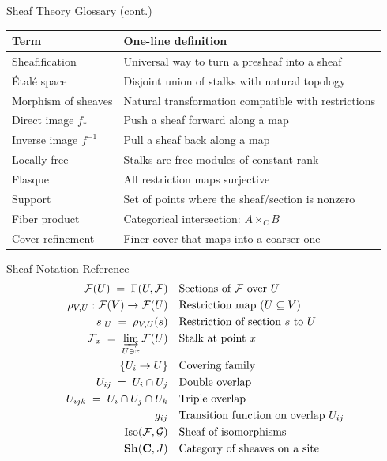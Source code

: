 \documentclass[aspectratio=169,10pt]{beamer}
\newcommand{\Fscr}{\mathcal{F}}
\newcommand{\Gscr}{\mathcal{G}}
\newcommand{\Iso}{\mathrm{Iso}}
\begin{document}
\begin{frame}{Sheaf Theory Glossary (cont.)}
\footnotesize
\renewcommand{\arraystretch}{1.2}
\begin{tabular}{@{}lp{8.5cm}@{}}
\toprule
\textbf{Term} & \textbf{One-line definition} \\
\midrule
Sheafification & Universal way to turn a presheaf into a sheaf \\
\'Etal\'e space & Disjoint union of stalks with natural topology \\
Morphism of sheaves & Natural transformation compatible with restrictions \\
Direct image $f_*$ & Push a sheaf forward along a map \\
Inverse image $f^{-1}$ & Pull a sheaf back along a map \\
Locally free & Stalks are free modules of constant rank \\
Flasque & All restriction maps surjective \\
Support & Set of points where the sheaf/section is nonzero \\
Fiber product & Categorical intersection: $A \times_C B$ \\
Cover refinement & Finer cover that maps into a coarser one \\
\bottomrule
\end{tabular}
\end{frame}

\begin{frame}{Sheaf Notation Reference}
\begin{align*}
\Fscr(U) \;=\; \Gamma(U, \Fscr) &\quad\text{Sections of $\Fscr$ over $U$} \\
\rho_{V,U} : \Fscr(V) \to \Fscr(U) &\quad\text{Restriction map ($U \subseteq V$)} \\
s|_U \;=\; \rho_{V,U}(s) &\quad\text{Restriction of section $s$ to $U$} \\
\Fscr_x \;=\; \varinjlim_{U \ni x} \Fscr(U) &\quad\text{Stalk at point $x$} \\
\{U_i \to U\} &\quad\text{Covering family} \\
U_{ij} \;=\; U_i \cap U_j &\quad\text{Double overlap} \\
U_{ijk} \;=\; U_i \cap U_j \cap U_k &\quad\text{Triple overlap} \\
g_{ij} &\quad\text{Transition function on overlap $U_{ij}$} \\
\Iso(\Fscr, \Gscr) &\quad\text{Sheaf of isomorphisms} \\
\mathbf{Sh}(\mathbf{C}, J) &\quad\text{Category of sheaves on a site}
\end{align*}
\end{frame}
\end{document}
